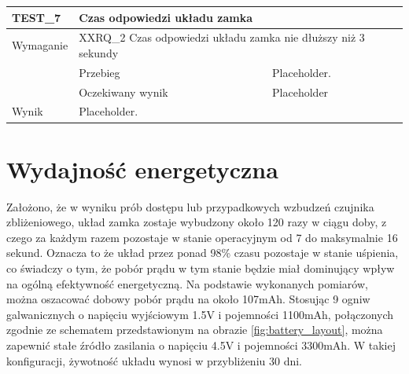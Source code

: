\begin{table}[h!]
\begin{subtable}[c]{\textwidth}
                \centering
                    \begin{tabular}{|p{2cm}|p{}|p{}|}
                    \hline
                    TEST\_7               & \multicolumn{2}{l|}{\textbf{Czas odpowiedzi układu zamka}}                                                            \\ \hline
                    \cellcolor[gray]{0.8} Wymaganie             & \multicolumn{2}{p{12cm}|}{XXRQ\_2 Czas odpowiedzi układu zamka nie dłuższy niż 3 sekundy }                                                                                    \\ \hline
                    \cellcolor[gray]{0.8} \multirow{2}{*}{Opis} & Przebieg           & Placeholder.  \\ \cline{2-3} 
                    \cellcolor[gray]{0.8}                      & Oczekiwany wynik   & Placeholder                                                 \\ \hline
                    \cellcolor[gray]{0.8} Wynik                 & \multicolumn{2}{p{12cm}|}{Placeholder.}                                                                                  \\ \hline
                    \end{tabular}%
                \label{tbl:test6}
                \vspace{10mm}           
            \end{subtable}
            \label{tbl:tests}
        \end{table}

    \section{Wydajność energetyczna}

    Założono, że w wyniku prób dostępu lub przypadkowych wzbudzeń czujnika zbliżeniowego, układ zamka zostaje wybudzony około 120 razy w ciągu doby, z czego za każdym razem pozostaje w stanie operacyjnym od 7 do maksymalnie 16 sekund. Oznacza to że układ przez ponad 98\% czasu pozostaje w stanie uśpienia, co świadczy o tym, że pobór prądu w tym stanie będzie miał dominujący wpływ na ogólną efektywność energetyczną. Na podstawie wykonanych pomiarów, można oszacować dobowy pobór prądu na około 107mAh. Stosując 9  ogniw galwanicznych o napięciu wyjściowym 1.5V i pojemności 1100mAh, połączonych zgodnie ze schematem przedstawionym na obrazie \ref{fig:battery_layout}, można zapewnić stałe źródło zasilania o napięciu 4.5V i pojemności 3300mAh. W takiej konfiguracji, żywotność układu wynosi w przybliżeniu 30 dni.

